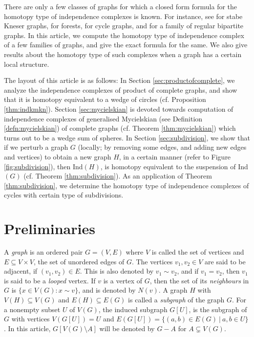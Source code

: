 \documentclass[12pt]{article}
\numberwithin{thm}{section}
\theoremstyle{definition}
\begin{document}
 There are only a few classes of graphs for which a closed form formula for the homotopy type of independence complexes is known. For instance, see \cite{BB} for stabe Kneser graphs, \cite{kk1} for forests, \cite{koz} for cycle graphs, and \cite{NS} for a family of regular bipartite graphs.  In this article, we compute the homotopy type of independence complex of a few families of graphs, and give the exact formula for the same. We also give results about the homotopy type of such complexes when a graph has a certain local structure. 
 

 
 
The layout of this article is as follows: In Section \ref{sec:productofcomplete}, we analyze the independence complexes  of product of complete graphs, and show that it is homotopy equivalent to a wedge of circles  (cf. Proposition \ref{thm:indkmkn}). Section \ref{sec:mycielskian} is devoted towards computation of independence complexes of generalised Mycielskian (see Definition \ref{defn:mycielskian}) of complete graphs (cf. Theorem \ref{thm:mycielskian}) which turns out to be a wedge sum of spheres. 
In Section \ref{sec:subdivision},  we show that if we perturb a  graph $G$ (locally; by removing some edges, and adding new edges and vertices) to obtain a new graph $H$, in a certain manner (refer to  Figure \ref{fig:subdivision}), then Ind$(H)$, is homotopy equivalent to the suspension of Ind$(G)$ (cf. Theorem \ref{thm:subdivision}). As an application of Theorem \ref{thm:subdivision}, we determine the homotopy type of independence complexes of cycles with certain type of subdivisions.

\section{Preliminaries}

A {\it graph} is an ordered pair $G=(V,E)$ where $V$ is called the set of vertices and $E \subseteq V \times V$, the set of unordered edges of $G$. The vertices $v_1, v_2 \in V$ are said to be adjacent, if $(v_1,v_2)\in E$. This is also denoted by $v_1 \sim v_2$, and if $v_1 = v_2$, then $v_1$ is said to be a \textit{looped} vertex. If $v$ is a vertex of $G$, then the set of its {\it neighbours} in $G$ is $\{x \in V(G): x \sim v\}$, and is denoted by $N(v)$. A graph $H$ with $V(H) \subseteq V(G)$ and $E(H) \subseteq E(G)$ is called a {\it subgraph} of the graph $G$. 
For a nonempty subset $U$ of $V(G)$, the induced subgraph $G[U]$, is the subgraph of $G$ with vertices $V(G[U]) = U$ and $E(G[U]) = \{(a, b) \in E(G) \ | \ a, b \in U\}$. In this article, $G[V(G)\setminus A]$ will be denoted by $G-A$ for $A\subsetneq V(G)$.
\end{document}

